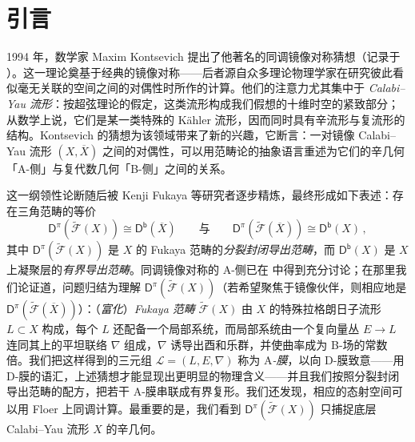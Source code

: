 \tableofcontents


\newpage

\setcounter{page}{1}



\section*{引言}
\thispagestyle{plain}

\vspace*{1cm}


1994 年，数学家 Maxim Kontsevich 提出了他著名的同调镜像对称猜想（记录于 \cite{[Kon94]}）。这一理论奠基于经典的镜像对称——后者源自众多理论物理学家在研究彼此看似毫无关联的空间之间的对偶性时所作的计算。他们的注意力尤其集中于 \textit{Calabi--Yau 流形}：按超弦理论的假定，这类流形构成我们假想的十维时空的紧致部分；从数学上说，它们是某一类特殊的 Kähler 流形，因而同时具有辛流形与复流形的结构。Kontsevich 的猜想为该领域带来了新的兴趣，它断言：一对镜像 Calabi--Yau 流形 $(X,\overline{X})$ 之间的对偶性，可以用范畴论的抽象语言重述为它们的辛几何「A-侧」与复代数几何「B-侧」之间的关系。

这一纲领性论断随后被 Kenji Fukaya 等研究者逐步精炼，最终形成如下表述：存在三角范畴的等价
\[
\mathsf{D}^\pi(\widetilde{\mathscr{F}}(X))\cong\mathsf{D^b}(\overline{X})\qquad\text{与}\qquad \mathsf{D}^\pi(\widetilde{\mathscr{F}}(\overline{X}))\cong\mathsf{D^b}(X)\,,
\]
其中 $\mathsf{D}^\pi(\widetilde{\mathscr{F}}(X))$ 是 $X$ 的 Fukaya 范畴的\textit{分裂封闭导出范畴}，而 $\mathsf{D^b}(X)$ 是 $X$ 上凝聚层的\textit{有界导出范畴}。同调镜像对称的 A-侧已在 \cite{[Imp21]} 中得到充分讨论；在那里我们论证道，问题归结为理解 $\mathsf{D}^\pi(\widetilde{\mathscr{F}}(X))$（若希望聚焦于镜像伙伴，则相应地是 $\mathsf{D}^\pi(\widetilde{\mathscr{F}}(\overline{X}))$）：（\textit{富化}）\textit{Fukaya 范畴} $\widetilde{\mathscr{F}}(X)$ 由 $X$ 的特殊拉格朗日子流形 $L\subset X$ 构成，每个 $L$ 还配备一个局部系统，而局部系统由一个复向量丛 $E\rightarrow L$ 连同其上的平坦联络 $\nabla$ 组成，$\nabla$ 诱导出酉和乐群，并使曲率成为 B-场的常数倍。我们把这样得到的三元组 $\mathcal{L}=(L,E,\nabla)$ 称为 A\textit{-膜}，以向 D-膜致意——用 D-膜的语汇，上述猜想才能显现出更明显的物理含义——并且我们按照分裂封闭导出范畴的配方，把若干 A-膜串联成有界复形。我们还发现，相应的态射空间可以用 Floer 上同调计算。最重要的是，我们看到 $\mathsf{D}^\pi(\widetilde{\mathscr{F}}(X))$ 只捕捉底层 Calabi--Yau 流形 $X$ 的辛几何。

